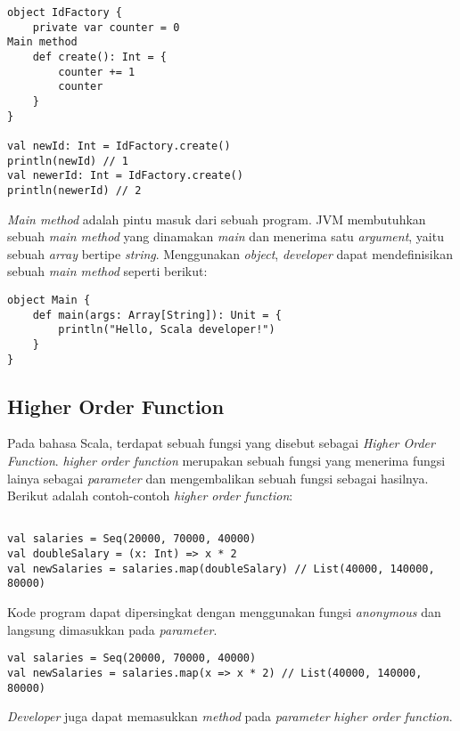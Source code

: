 \begin{verbatim}
object IdFactory {
    private var counter = 0
Main method
  	def create(): Int = {
        counter += 1
        counter
    }
}

val newId: Int = IdFactory.create()
println(newId) // 1
val newerId: Int = IdFactory.create()
println(newerId) // 2

\end{verbatim}

\textit{Main method} adalah pintu masuk dari sebuah program. JVM membutuhkan sebuah \textit{main method} yang dinamakan \textit{main} dan menerima satu \textit{argument}, yaitu sebuah \textit{array} bertipe \textit{string}. Menggunakan \textit{object}, \textit{developer} dapat mendefinisikan sebuah \textit{main method} seperti berikut: 

\begin{verbatim}
object Main {
  	def main(args: Array[String]): Unit = {
        println("Hello, Scala developer!")
    }
}
\end{verbatim}

\subsection{Higher Order Function}

Pada bahasa Scala, terdapat sebuah fungsi yang disebut sebagai \textit{Higher Order Function}. \textit{higher order function} merupakan sebuah fungsi yang menerima fungsi lainya sebagai \textit{parameter} dan mengembalikan sebuah fungsi sebagai hasilnya. Berikut adalah contoh-contoh \textit{higher order function}:

\begin{verbatim}

val salaries = Seq(20000, 70000, 40000) 
val doubleSalary = (x: Int) => x * 2
val newSalaries = salaries.map(doubleSalary) // List(40000, 140000, 80000)

\end{verbatim}

Kode program dapat dipersingkat dengan menggunakan fungsi \textit{anonymous} dan langsung dimasukkan pada \textit{parameter}.

\begin{verbatim}
val salaries = Seq(20000, 70000, 40000)
val newSalaries = salaries.map(x => x * 2) // List(40000, 140000, 80000)
\end{verbatim}

\textit{Developer} juga dapat memasukkan \textit{method} pada \textit{parameter} \textit{higher order function}.


